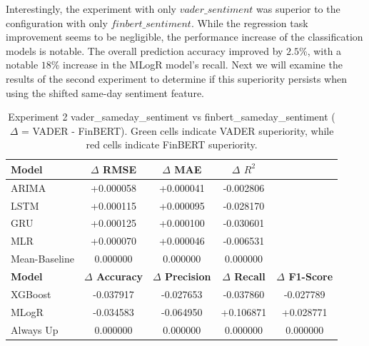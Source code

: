 \documentclass[Master,english,IEEE]{twbook}
\begin{document}
Interestingly, the experiment with only $vader\_sentiment$ was superior to the configuration with only $finbert\_sentiment$. While the regression task improvement seems to be negligible, the performance increase of the classification models is notable. The overall prediction accuracy improved by $2.5$\%, with a notable $18$\% increase in the MLogR model's recall. Next we will examine the results of the second experiment to determine if this superiority persists when using the shifted same-day sentiment feature.

\begin{table}[H]
    \centering
    \small %
    \setlength{\tabcolsep}{4pt} %
    \begin{tabular}{|lcccc|}
        \hline
        \textbf{Model} & \textbf{$\Delta$ RMSE} & \textbf{$\Delta$ MAE} & \textbf{$\Delta$ $R^2$} & \\
        \hline
        ARIMA          & \cellcolor{red!25}+0.000058  & \cellcolor{red!25}+0.000041 & \cellcolor{red!25}-0.002806 & \\
        LSTM           & \cellcolor{red!25}+0.000115  & \cellcolor{red!25}+0.000095 & \cellcolor{red!25}-0.028170 & \\
        GRU            & \cellcolor{red!25}+0.000125  & \cellcolor{red!25}+0.000100 & \cellcolor{red!25}-0.030601 & \\
        MLR            & \cellcolor{red!25}+0.000070  & \cellcolor{red!25}+0.000046 & \cellcolor{red!25}-0.006531 & \\
        Mean-Baseline  &  0.000000                    &  0.000000                   &  0.000000                   & \\
        \hline
        \textbf{Model} & \textbf{$\Delta$ Accuracy} & \textbf{$\Delta$ Precision} & \textbf{$\Delta$ Recall} & \textbf{$\Delta$ F1-Score} \\
        \hline
        XGBoost        & \cellcolor{red!25}-0.037917  & \cellcolor{red!25}-0.027653 & \cellcolor{red!25}-0.037860   & \cellcolor{red!25}-0.027789   \\
        MLogR          & \cellcolor{red!25}-0.034583  & \cellcolor{red!25}-0.064950 & \cellcolor{green!25}+0.106871 & \cellcolor{green!25}+0.028771 \\
        Always Up      &  0.000000                    &  0.000000                   &  0.000000                     &  0.000000                     \\
        \hline
    \end{tabular}
    \caption{Experiment 2 vader\_sameday\_sentiment vs finbert\_sameday\_sentiment ($\Delta$ = VADER - FinBERT). Green cells indicate VADER superiority, while red cells indicate FinBERT superiority.}
    \label{tab:vader_advantage_shifted}
\end{table}
\end{document}
